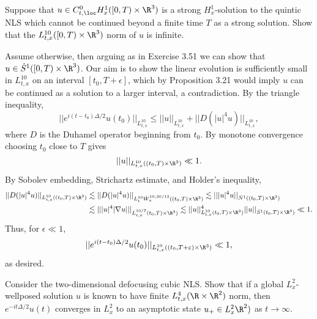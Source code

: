 \begin{statement}
	Suppose that $u \in C^0_{t, \loc} H^1_x ([0, T) \times \R^3)$ is a strong $H^1_x$-solution to the quintic NLS which cannot be continued beyond a finite time $T$ as a strong solution. Show that the $L^{10}_{t, x} ([0, T) \times \R^3)$ norm of $u$ is infinite. 
\end{statement}

\begin{solution}
	Assume otherwise, then arguing as in Exercise 3.51 we can show that $u \in \dot S^1 ([0, T) \times \R^3)$. Our aim is to show the linear evolution is sufficiently small in $L^{10}_{t, x}$ on an interval $[t_0, T + \epsilon]$, which by Proposition 3.21 would imply $u$ can be continued as a solution to a larger interval, a contradiction. By the triangle inequality, 
		\[ ||e^{i(t - t_0) \Delta/2} u(t_0) ||_{L^{10}_{t, x}} \leq ||u||_{L^{10}_{t, x}} + || D (|u|^4 u)||_{L^{10}_{t, x}}, \]	
	where $D$ is the Duhamel operator beginning from $t_0$. By monotone convergence choosing $t_0$ close to $T$ gives
		\[ ||u||_{L^{10}_{t, x}((t_0, T) \times \R^3)} \ll 1. \]
	By Sobolev embedding, Strichartz estimate, and Holder's inequality, 
	\begin{align*}
			||D(|u|^4 u)||_{L^{10}_{t, x}((t_0, T) \times \R^3)} 
				&\lesssim || D(|u|^4 u) ||_{L^{10}_t \dot W^{10, 30/13}_x ((t_0, T) \times \R^3)} \lesssim |||u|^4 u||_{\dot N^1 ((t_0, T) \times \R^3)} \\
				&\lesssim || |u|^4 |\nabla u| ||_{L^{10/7}_{t, x} (t_0, T) \times \R^3)} \lesssim ||u||_{L^{10}_{t, x} (t_0, T) \times \R^3)}^4 ||u||_{\dot S^1 (t_0, T) \times \R^3)} \ll 1.
		\end{align*}
	Thus, for $\epsilon \ll 1$, 
		\[ ||e^{i(t - t_0) \Delta/2} u(t_0) ||_{L^{10}_{t, x} ((t_0, T + \epsilon) \times \R^3)} \ll 1,  \]
	as desired. 
\end{solution}

\begin{statement}
	Consider the two-dimensional defocusing cubic NLS. Show that if a global $L^2_x$-wellposed solution $u$ is known to have finite $L^4_{t, x} (\R \times \R^2)$ norm, then $e^{-i t \Delta/2} u(t)$ converges in $L^2_x$ to an asymptotic state $u_+ \in L^2_x \R^2)$ as $t \to \infty$. 
\end{statement}

